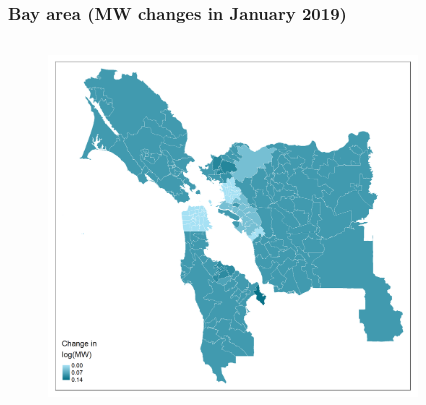\documentclass[aspectratio=169, t]{beamer}
\begin{document}
\begin{frame}[label = nyc_example]
\begin{columns}
\begin{column}{0.50\textwidth}
\begin{figure}
            \end{figure}   
        \end{column}
    \end{columns}
    \hyperlink{chi_example}{}
\end{frame}

\begin{frame}[label = bay_example]
\frametitle{Bay area (MW changes in January 2019)}
    \begin{columns}
        \begin{column}{0.50\textwidth}
            \vspace{-4mm}
            \begin{figure}
                \centering
                \includegraphics[scale = 0.36]{maps_events/output/bay_area_2018-12_actual_mw.png}
            \end{figure}   
        \end{column}
        \begin{column}{0.50\textwidth}
            \vspace{-4mm}
            \begin{figure}
                \centering

\end{figure}
\end{column}
\end{columns}
\end{frame}
\end{document}
